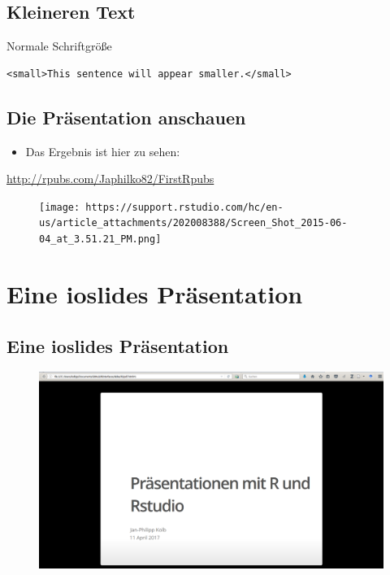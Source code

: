 \documentclass[]{article}
\providecommand{\tightlist}{%
  \setlength{\itemsep}{0pt}\setlength{\parskip}{0pt}}
\begin{document}
\subsection{Kleineren Text}\label{kleineren-text}

Normale Schriftgröße

\begin{verbatim}
<small>This sentence will appear smaller.</small>
\end{verbatim}

\subsection{Die Präsentation
anschauen}\label{die-prasentation-anschauen}

\begin{itemize}
\tightlist
\item
  Das Ergebnis ist hier zu sehen:
\end{itemize}

\url{http://rpubs.com/Japhilko82/FirstRpubs}

\begin{figure}
\centering
\texttt{[image: https://support.rstudio.com/hc/en-us/article\_attachments/202008388/Screen\_Shot\_2015-06-04\_at\_3.51.21\_PM.png]}
\caption{}
\end{figure}

\section{Eine ioslides Präsentation}\label{eine-ioslides-prasentation}

\subsection{Eine ioslides
Präsentation}\label{eine-ioslides-prasentation-1}

\begin{figure}
\centering
\includegraphics{figure/ioslidespres.PNG}
\caption{}
\end{figure}
\end{document}

